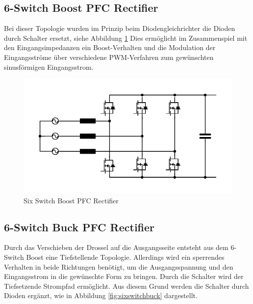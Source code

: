 	\subsection{6-Switch Boost PFC Rectifier}
				Bei dieser Topologie wurden im Prinzip beim Diodengleichrichter die Dioden durch Schalter ersetzt, siehe Abbildung \ref{fig:sixswitchboost} Dies ermöglicht im Zusammenspiel mit den Eingangsimpedanzen ein Boost-Verhalten und die Modulation der Eingangsströme über verschiedene \gls{PWM}-Verfahren zum gewünschten sinusförmigen Eingangsstrom.
			\begin{figure} 
				\centering
				\includegraphics[width=1\linewidth]{content/Grafiken/SixSwitchBoost}
				\caption{Six Switch Boost PFC Rectifier}
				\label{fig:sixswitchboost}
			\end{figure}
		
	\subsection{6-Switch Buck PFC Rectifier}
		\label{sec:6switchBuck}
		Durch das Verschieben der Drossel auf die Ausgangsseite entsteht aus dem 6-Switch Boost eine Tiefstellende Topologie. Allerdings wird ein sperrendes Verhalten in beide Richtungen benötigt, um die Ausgangsspannung und den Eingangsstrom in die gewünschte Form zu bringen. Durch die Schalter wird der Tiefsetzende Strompfad ermöglicht. Aus diesem Grund werden die Schalter durch Dioden ergänzt, wie in Abbildung \ref{fig:sixswitchbuck} dargestellt.  
		
